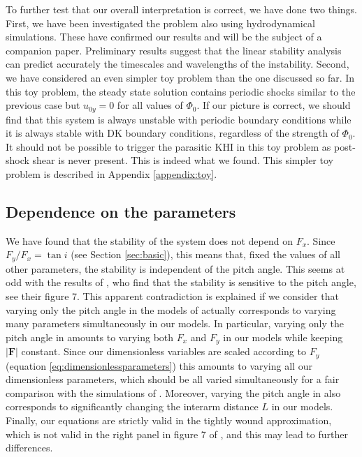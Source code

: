 \documentclass[useAMS,usenatbib]{mn2e}
\begin{document}
To further test that our overall interpretation is correct, we have done two things. First, we have been investigated the problem also using hydrodynamical simulations. These have confirmed our results and will be the subject of a companion paper. Preliminary results suggest that the linear stability analysis can predict accurately the timescales and wavelengths of the instability. Second, we have considered an even simpler toy problem than the one discussed so far. In this toy problem, the steady state solution contains periodic shocks similar to the previous case but $u_{0y}=0$ for all values of $\Phi_0$. If our picture is correct, we should find that this system is always unstable with periodic boundary conditions while it is always stable with DK boundary conditions, regardless of the strength of $\Phi_0$. It should not be possible to trigger the parasitic KHI in this toy problem as post-shock shear is never present. This is indeed what we found. This simpler toy problem is described in Appendix \ref{appendix:toy}.

\subsection{Dependence on the parameters}

We have found that the stability of the system does not depend on $F_x$. Since $F_y/F_x=\tan i$ (see Section \ref{sec:basic}), this means that, fixed the values of all other parameters, the stability is independent of the pitch angle. This seems at odd with the results of \cite{WadaKoda2004}, who find that the stability is sensitive to the pitch angle, see their figure 7. This apparent contradiction is explained if we consider that varying only the pitch angle in the models of \cite{WadaKoda2004} actually corresponds to varying many parameters simultaneously in our models. In particular, varying only the pitch angle in \cite{WadaKoda2004} amounts to varying both $F_x$ and $F_y$ in our models while keeping $|\mathbf{F}|$ constant. Since our dimensionless variables are scaled according to $F_y$ (equation \ref{eq:dimensionlessparameters}) this amounts to varying all our dimensionless parameters, which should be all varied simultaneously for a fair comparison with the simulations of \cite{WadaKoda2004}. Moreover, varying the pitch angle in \cite{WadaKoda2004} also corresponds to significantly changing the interarm distance $L$ in our models. Finally, our equations are strictly valid in the tightly wound approximation, which is not valid in the right panel in figure 7 of \cite{WadaKoda2004}, and this may lead to further differences.
\end{document}
